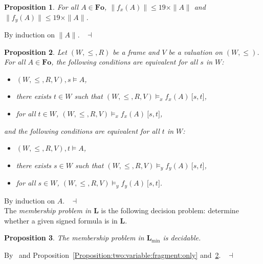 \documentclass[draft]{article}
\newtheorem{proposition}{Proposition}
\newenvironment{proof}{{\bf Proof:}}{~$\dashv$\\}
\def\Fo{\mathbf{Fo}}
\def\L{\mathbf{L}}
\begin{document}
%
%
\begin{proposition}\label{Proposition:about:translations:tau:x:tau:y:linear:size}
%
%
For all $A{\in}\Fo$, ${\parallel}f_{x}(A){\parallel}{\leq}19{\times}{\parallel}A{\parallel}$ and ${\parallel}f_{y}(A){\parallel}{\leq}19{\times}{\parallel}A{\parallel}$.
%
%
\end{proposition}
%
%
\begin{proof}
%
%
By induction on ${\parallel}A{\parallel}$.
%
%
\end{proof}
%
%
\begin{proposition}\label{Proposition:about:translations:tau:x:tau:y:soundness:correctness}
%
%
Let $(W,{\leq},{R})$ be a frame and $V$ be a valuation on $(W,{\leq})$.
For all $A{\in}\Fo$, the following conditions are equivalent for all $s$ in $W$:
%
%
\begin{itemize}
%
%
\item $(W,{\leq},{R},V),s{\models}A$,
%
%
\item there exists $t{\in}W$ such that $(W,{\leq},{R},V){\models_{x}}f_{x}(A)\ \lbrack s,t\rbrack$,
%
%
\item for all $t{\in}W$, $(W,{\leq},{R},V){\models_{x}}f_{x}(A)\ \lbrack s,t\rbrack$,
%
%
\end{itemize}
%
%
and the following conditions are equivalent for all $t$ in $W$:
%
%
\begin{itemize}
%
%
\item $(W,{\leq},{R},V),t{\models}A$,
%
%
\item there exists $s{\in}W$ such that $(W,{\leq},{R},V){\models_{y}}f_{y}(A)\ \lbrack s,t\rbrack$,
%
%
\item for all $s{\in}W$, $(W,{\leq},{R},V){\models_{y}}f_{y}(A)\ \lbrack s,t\rbrack$.
%
%
\end{itemize}
%
%
\end{proposition}
%
%
\begin{proof}
%
%
By induction on $A$.
%
%
\medskip
%
%
\end{proof}
%
%
The {\em membership problem in $\L$}\/ is the following decision problem: determine whether a given signed formula is in $\L$.
%
%
\begin{proposition}\label{proposition:two:variable:guarded:fragment:is:decidable}
%
%
The membership problem in $\L_{\min}$ is decidable.
%
%
\end{proposition}
%
%
\begin{proof}
%
%
By~\cite[Section~$3$]{Ganzinger:et:al:1999} and Proposition~\ref{Proposition:two:variable:fragment:only} and~\ref{Proposition:about:translations:tau:x:tau:y:soundness:correctness}.
%
%
\medskip
%
%
\end{proof}
\end{document}
